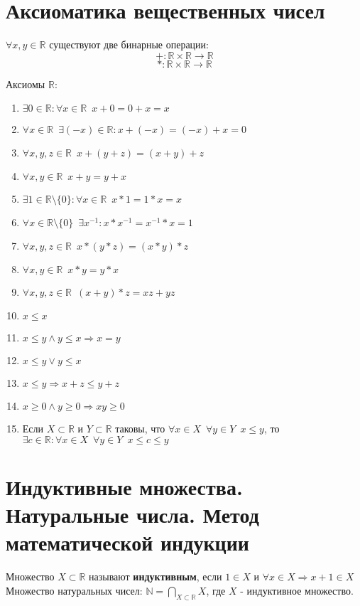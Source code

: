 \documentclass[11pt, a4paper]{article}
\def\R{\mathbb{R}}
\def\N{\mathbb{N}}
\def\sp{\, \, \,}
\begin{document}
    \tableofcontents \pagebreak


    \section{Аксиоматика вещественных чисел}
    $\forall x,y \in \R$ существуют две бинарные операции:
    $$+: \R \times \R \to \R$$
    $$*: \R \times \R \to \R$$

    Аксиомы $\R$:
    \begin{enumerate}
        \item $\exists 0 \in \R : \forall x \in \R \sp x + 0 = 0 + x = x$
        \item $\forall x \in \R \sp \exists (-x) \in \R: x + (-x) = (-x) + x = 0$
        \item $\forall x,y,z \in \R \sp x+(y+z)=(x+y)+z$
        \item $\forall x,y \in \R \sp x+y = y+x$
        \item $\exists 1 \in \R \setminus \{0\}: \forall x \in \R \sp x*1 = 1*x = x$
        \item $\forall x \in \R \setminus \{0\} \sp \exists x^{-1}: x*x^{-1} = x^{-1}*x = 1$
        \item $\forall x,y,z \in \R \sp x*(y*z)=(x*y)*z$
        \item $\forall x,y \in \R \sp x*y = y*x$
        \item $\forall x,y,z \in \R \sp (x+y)*z=xz + yz$
        \item $x \leq x$
        \item $x \leq y \land y \leq x \Rightarrow x = y$
        \item $x \leq y \lor y \leq x$
        \item $x \leq y \Rightarrow x+z \leq y+z$
        \item $x \geq 0 \land y \geq 0 \Rightarrow xy \geq 0$
        \item Если $X \subset \R$ и $Y \subset \R$ таковы, что $\forall x \in X \sp \forall y \in Y \sp x \leq y$, то $\exists c \in \R: \forall x \in X \sp \forall y \in Y \sp x \leq c \leq y$
    \end{enumerate}

    \section{Индуктивные множества. Натуральные числа. Метод математической индукции}
    Множество $X \subset \R$ называют \textbf{индуктивным}, если $1 \in X$ и $\forall x \in X \Rightarrow x+1 \in X$\\
    Множество натуральных чисел: $\displaystyle \N = \bigcap_{X \subset \R} X$, где $X$ - индуктивное множество.
    
\end{document}
